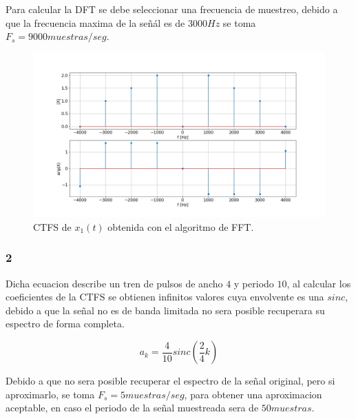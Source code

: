 \documentclass[letterpaper]{article}
\begin{document}
    Para calcular la DFT se debe seleccionar una frecuencia de muestreo, debido a que la frecuencia maxima de la señál es de $3000Hz$ se
    toma $F_s = 9000 muestras / seg$.

    \begin{figure}[H]
        \centering
        \includegraphics[width=\textwidth]{Img/punto_2_g_1.png}
        \caption{CTFS de $x_1(t)$ obtenida con el algoritmo de FFT.}
        \label{fig.2gi}
    \end{figure}
    
    \subsubsection*{2}

    Dicha ecuacion describe un tren de pulsos de ancho $4$ y periodo $10$, al calcular los coeficientes de la CTFS se obtienen
    infinitos valores cuya envolvente es una $sinc$, debido a que la señal no es de banda limitada no sera posible recuperara su espectro 
    de forma completa. 

    \begin{equation}
        a_k = \frac{4}{10} sinc \left( \frac{2}{4}k \right)
    \end{equation}

    Debido a que no sera posible recuperar el espectro de la señal original, pero si aproximarlo, se toma $F_s=5 muestras/seg$, para
    obtener una aproximacion aceptable, en caso el periodo de la señal muestreada sera de $50 muestras$.
\end{document}
